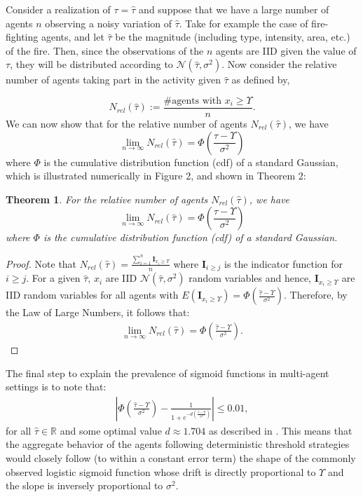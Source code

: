 \documentclass[defaultstyle,12pt]{thesis}
\newtheorem{theorem}{Theorem}
\newcommand{\R}{\mathbb{R}}    %
\newcommand{\td}{\Upsilon}   %
\begin{document}
Consider a realization of $\tau=\hat{\tau}$ and suppose that we have a large number of agents $n$ observing a noisy variation of $\hat{\tau}$. Take for example the case of fire-fighting agents, and let $\hat{\tau}$ be the magnitude (including type, intensity, area, etc.) of the fire. Then, since the observations of the $n$ agents are IID given the value of $\tau$, they will be distributed according to $\mathcal{N}(\hat{\tau},\sigma^2)$. Now consider the relative number of agents taking part in the activity given $\hat{\tau}$ as defined by,

\begin{equation*}
	N_{rel}(\hat{\tau}):=\frac{\#\text{agents with }x_i\geq \td}{n}.
\end{equation*}
We can now show that for the relative number of agents $N_{rel}(\hat{\tau})$, we have
\begin{equation}
\lim_{n\to\infty}N_{rel}(\hat{\tau})=\Phi(\frac{\hat{\tau}-\td}{\sigma^2})
\end{equation}
where $\Phi$ is the cumulative distribution function (cdf) of a standard Gaussian, which is illustrated numerically in Figure 2, and shown in Theorem 2:  

\begin{theorem}\label{thrm:relativefrequency}
For the relative number of agents $N_{rel}(\hat{\tau})$, we have
\begin{equation}
\lim_{n\to\infty}N_{rel}(\hat{\tau})=\Phi(\frac{\hat{\tau}-\td}{\sigma^2})
\end{equation}
where $\Phi$ is the cumulative distribution function (cdf) of a standard Gaussian. 
\end{theorem}
\begin{proof}
Note that $N_{rel}(\hat{\tau})=\frac{\sum_{i=1}^n\mathbf{I}_{x_i\geq \td}}{n}$ where $\mathbf{I}_{i\geq j}$ is the indicator function for $i\geq j$. For a given $\hat{\tau}$, $x_i$ are IID $\mathcal{N}(\hat{\tau},\sigma^2)$ random variables and hence, $\mathbf{I}_{x_i\geq \td}$ are IID random variables for all agents with $E(\mathbf{I}_{x_i\geq \td})=\Phi(\frac{\hat{\tau}-\td}{\sigma^2})$. Therefore, by the Law of Large Numbers, it follows that:
\begin{align}
\lim_{n\to\infty}N_{rel}(\hat{\tau})=\Phi(\frac{\hat{\tau}-\td}{\sigma^2}).
\end{align}
\end{proof}

The final step to explain the prevalence of sigmoid functions in multi-agent settings is to note that:
\begin{align}
|\Phi(\frac{\hat{\tau}-\td}{\sigma^2})-\frac{1}{1+e^{-d(\frac{\hat{\tau}-\td}{\sigma^2})}}|\leq 0.01,
\end{align}
for all $\hat{\tau}\in\R$ and some optimal value $d\approx 1.704$ as described in \cite{Camilli1994}. This means that the aggregate behavior of the agents following deterministic threshold strategies would closely follow (to within a constant error term) the shape of the commonly observed logistic sigmoid function whose drift is directly proportional to $\td$ and the slope is inversely proportional to $\sigma^2$. 
\end{document}

